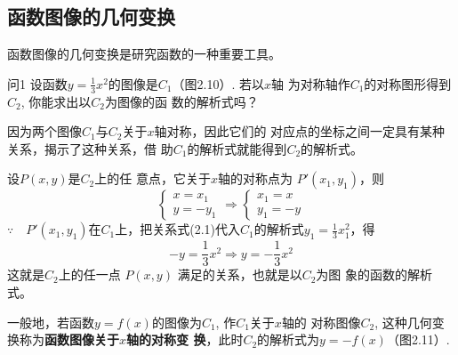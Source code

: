 \subsection{函数图像的几何变换}
函数图像的几何变换是研究函数的一种重要工具。

\begin{thm}{问1}
设函数$y=\frac{1}{3}x^2$的图像是$C_1$（图2.10）. 若以$x$轴
为对称轴作$C_1$的对称图形得到$C_2$, 你能求出以$C_2$为图像的函
数的解析式吗？
\end{thm}

\begin{figure}[htp]
    \centering
{}
    \caption{}
\end{figure}

\begin{analyze}
    因为两个图像$C_1$与$C_2$关于$x$轴对称，因此它们的
对应点的坐标之间一定具有某种关系，揭示了这种关系，借
助$C_1$的解析式就能得到$C_2$的解析式。
\end{analyze}

设$P(x,y)$是$C_2$上的任
意点，它关于$x$轴的对称点为
$P'(x_1,y_1)$，则
\begin{equation}
\begin{cases}
    x=x_1\\
    y=-y_1
\end{cases}\Longrightarrow \begin{cases}
    x_1=x\\ y_1=-y
\end{cases}
\end{equation}
$\because\quad P'(x_1,y_1)$在$C_1$上，把关系式(2.1)代入$C_1$的解析式$y_1=\frac{1}{3}x^2_1$，得
\[-y=\frac{1}{3}x^2 \Longrightarrow y=-\frac{1}{3}x^2\]
这就是$C_2$上的任一点
$P(x,y)$
满足的关系，也就是以$C_2$为图
象的函数的解析式。

一般地，若函数$y=f(x)$的图像为$C_1$, 作$C_1$关于$x$轴的
对称图像$C_2$, 这种几何变换称为\textbf{函数图像关于$x$轴的对称变
换}，此时$C_2$的解析式为$y=-f(x)$（图2.11）.

